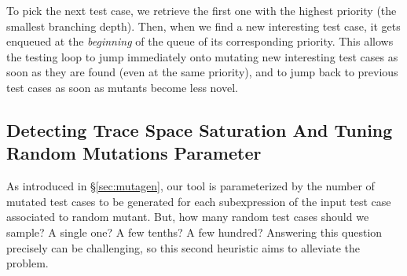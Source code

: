 \documentclass[sigconf,review,anonymous]{acmart}
\newcommand{\mutagen}{\textsc{Mutagen}\xspace}
\begin{document}
To pick the next test case, we retrieve the first one with the highest priority
(the smallest branching depth).
%
Then, when we find a new interesting test case, it gets enqueued at the
\emph{beginning} of the queue of its corresponding priority.
%
This allows the testing loop to jump immediately onto mutating new interesting
test cases as soon as they are found (even at the same priority), and to jump
back to previous test cases as soon as mutants become less novel.




\subsection{Detecting Trace Space Saturation And Tuning Random Mutations Parameter}

As introduced in \S \ref{sec:mutagen}, our tool is parameterized by the number
of mutated test cases to be generated for each subexpression of the input test
case associated to random mutant.
%
But, how many random test cases should we sample? A single one? A few tenths? A
few hundred?
%
Answering this question precisely can be challenging, so this second heuristic
aims to alleviate the problem.
\end{document}
